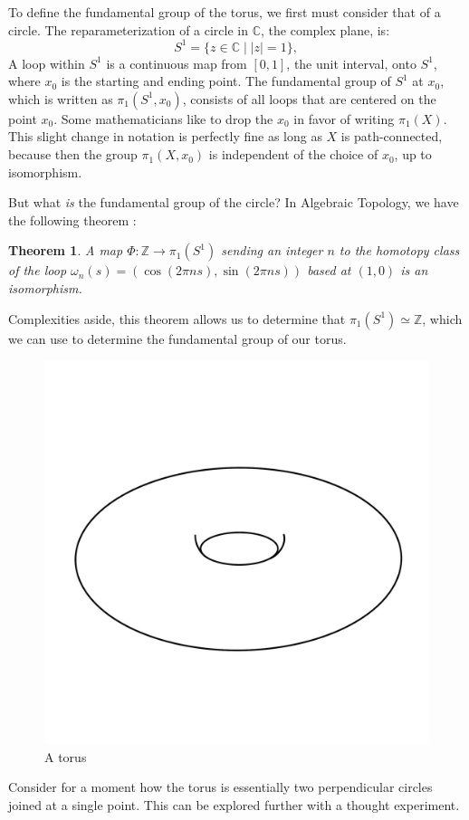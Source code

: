 \documentclass[12pt,a4paper,reqno,parskip=full]{amsart}
\numberwithin{equation}{section}
\theoremstyle{plain}
\newtheorem{theorem}[subsection]{Theorem}
\theoremstyle{definition}
\def\Z{{\mathbb Z}}
\def\C{{\mathbb C}}
\begin{document}
To define the fundamental group of the torus, we first must consider that of a circle. The reparameterization of a circle in $\C$, the complex plane, is:
\[S^1=\{z\in\C\mid |z|=1\},\]
A loop within $S^1$ is a continuous map from $[0,1]$, the unit interval, onto $S^1$, where $x_0$ is the starting and ending point. The fundamental group of $S^1$ at $x_0$, which is written as $\pi_1(S^1,x_0)$, consists of all loops that are centered on the point $x_0$. Some mathematicians like to drop the $x_0$ in favor of writing $\pi_1(X)$. This slight change in notation is perfectly fine as long as $X$ is path-connected, because then the group $\pi_1(X,x_0)$ is independent of the choice of $x_0$, up to isomorphism.

But what \textit{is} the fundamental group of the circle? In Algebraic Topology, we have the following theorem \cite{Hatcher_2002}:
\begin{theorem}
A map $\Phi:\Z\to\pi_1(S^1)$ sending an integer $n$ to the homotopy class of the loop $\omega_n(s)=(\cos(2\pi ns),\sin(2\pi ns))$ based at $(1,0)$ is an isomorphism.
\end{theorem}

Complexities aside, this theorem allows us to determine that $\pi_1(S^1)\simeq\Z$, which we can use to determine the fundamental group of our torus.

\begin{figure}
    \centering
    \captionsetup{justification=centering}
    \includegraphics[width=0.5\linewidth]{images/plain torus.jpg}
    \caption{A torus}
    \label{fig:torus}
\end{figure}

Consider for a moment how the torus is essentially two perpendicular circles joined at a single point. This can be explored further with a thought experiment.
\end{document}
